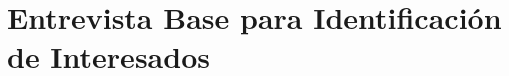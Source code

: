 \section{Entrevista Base para Identificación de Interesados}
\label{appendix:entrevista_posible_interesado}